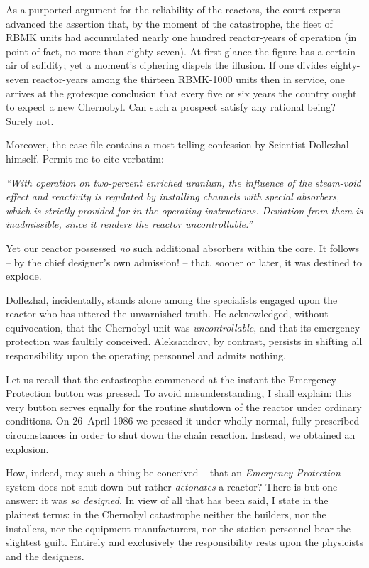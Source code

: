 \documentclass[openright]{bookest}
\begin{document}
As a purported argument for the reliability of the reactors, the court experts advanced the assertion that, by the moment of the catastrophe, the fleet of RBMK units had accumulated nearly one hundred reactor-years of operation (in point of fact, no more than eighty-seven). At first glance the figure has a certain air of solidity; yet a moment's ciphering dispels the illusion. If one divides eighty-seven reactor-years among the thirteen RBMK-1000 units then in service, one arrives at the grotesque conclusion that every five or six years the country ought to expect a new Chernobyl. Can such a prospect satisfy any rational being? Surely not.

Moreover, the case file contains a most telling confession by Scientist Dollezhal himself. Permit me to cite verbatim:

\begin{personal}
\textit{``With operation on two-percent enriched uranium, the influence of the steam-void effect and reactivity is regulated by installing channels with special absorbers, which is strictly provided for in the operating instructions. Deviation from them is inadmissible, since it renders the reactor uncontrollable.''}
\end{personal}

Yet our reactor possessed \textit{no} such additional absorbers within the core. It follows -- by the chief designer's own admission! -- that, sooner or later, it was destined to explode.

Dollezhal, incidentally, stands alone among the specialists engaged upon the reactor who has uttered the unvarnished truth. He acknowledged, without equivocation, that the Chernobyl unit was \textit{uncontrollable}, and that its emergency protection was faultily conceived. Aleksandrov, by contrast, persists in shifting all responsibility upon the operating personnel and admits nothing.

Let us recall that the catastrophe commenced at the instant the Emergency Protection button was pressed. To avoid misunderstanding, I shall explain: this very button serves equally for the routine shutdown of the reactor under ordinary conditions. On 26~April 1986 we pressed it under wholly normal, fully prescribed circumstances in order to shut down the chain reaction. Instead, we obtained an explosion.

How, indeed, may such a thing be conceived -- that an \textit{Emergency Protection} system does not shut down but rather \textit{detonates} a reactor? There is but one answer: it was \textit{so designed}. In view of all that has been said, I state in the plainest terms: in the Chernobyl catastrophe neither the builders, nor the installers, nor the equipment manufacturers, nor the station personnel bear the slightest guilt. Entirely and exclusively the responsibility rests upon the physicists and the designers.
\end{document}

